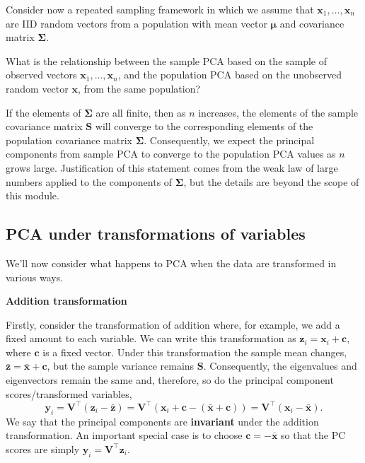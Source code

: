 \documentclass[
]{book}
\theoremstyle{definition}
\theoremstyle{definition}
\theoremstyle{definition}
\theoremstyle{definition}
\theoremstyle{remark}
\begin{document}
Consider now a repeated sampling framework in which we assume that \(\mathbf x_1, \ldots , \mathbf x_n\) are IID random vectors from a population
with mean vector \(\pmb \mu\) and covariance matrix \(\boldsymbol{\Sigma}\).

What is the relationship between the sample PCA based on the sample of observed vectors \(\mathbf x_1, \ldots , \mathbf x_n\), and the population PCA based on the unobserved random vector \(\mathbf x\),
from the same population?

If the elements of \(\boldsymbol{\Sigma}\) are all finite, then as \(n\) increases, the elements of the sample covariance matrix \(\mathbf S\) will converge to the corresponding elements
of the population covariance matrix \(\boldsymbol{\Sigma}\). Consequently, we expect the principal components from sample PCA to converge to the population PCA values as \(n\) grows large. Justification of this statement comes from the weak law of large numbers applied to the components of \(\boldsymbol{\Sigma}\), but the details are beyond the scope of this module.

\subsection{PCA under transformations of variables}\label{pca-under-transformations-of-variables}

We'll now consider what happens to PCA when the data are transformed in various ways.

\textbf{Addition transformation}

Firstly, consider the transformation of addition where, for example, we add a fixed amount to each variable.
We can write this transformation as \(\mathbf z_i = \mathbf x_i + \mathbf c\), where \(\mathbf c\) is a fixed vector. Under this transformation the sample mean changes, \(\bar{\mathbf z} = \bar{\mathbf x} + \mathbf c\), but the sample variance remains \(\mathbf S\). Consequently, the eigenvalues and eigenvectors remain the same and, therefore, so do the principal component scores/transformed variables,
\[\mathbf y_i = \mathbf V^\top (\mathbf z_i - \bar{\mathbf z}) = \mathbf V^\top(\mathbf x_i + \mathbf c- (\bar{\mathbf x} + \mathbf c)) = \mathbf V^\top (\mathbf x_i - \bar{\mathbf x}).\]
We say that the principal components are \textbf{invariant} under the addition transformation. An important special case is to choose \(\mathbf c= -\bar{\mathbf x}\) so that the PC scores are simply \(\mathbf y_i = \mathbf V^\top \mathbf z_i\).
\end{document}
